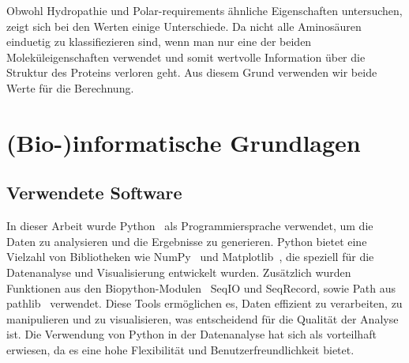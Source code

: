 \documentclass[german,version-2022-01]{uzl-thesis}
\begin{document}
Obwohl Hydropathie und Polar-requirements \"ahnliche Eigenschaften untersuchen, zeigt sich bei den Werten einige Unterschiede. Da nicht alle Aminos\"auren einduetig zu klassifiezieren sind, wenn man nur eine der beiden Molek\"uleigenschaften verwendet und somit wertvolle Information \"uber die Struktur des Proteins verloren geht. Aus diesem Grund verwenden wir beide Werte f\"ur die Berechnung. 

\section{(Bio-)informatische Grundlagen}



\subsection{Verwendete Software}
In dieser Arbeit wurde Python~\cite{python} als Programmiersprache verwendet, um die Daten zu analysieren und die Ergebnisse zu generieren. Python bietet eine Vielzahl von Bibliotheken wie NumPy~\cite{numpy} und Matplotlib~\cite{matplotlib}, die speziell f\"ur die Datenanalyse und Visualisierung entwickelt wurden. Zus\"atzlich wurden Funktionen aus den Biopython-Modulen~\cite{cock2009biopython} SeqIO und SeqRecord, sowie Path aus pathlib~\cite{pathlib} verwendet. Diese Tools erm\"oglichen es, Daten effizient zu verarbeiten, zu manipulieren und zu visualisieren, was entscheidend f\"ur die Qualit\"at der Analyse ist. Die Verwendung von Python in der Datenanalyse hat sich als vorteilhaft erwiesen, da es eine hohe Flexibilit\"at und Benutzerfreundlichkeit bietet.
\end{document}
